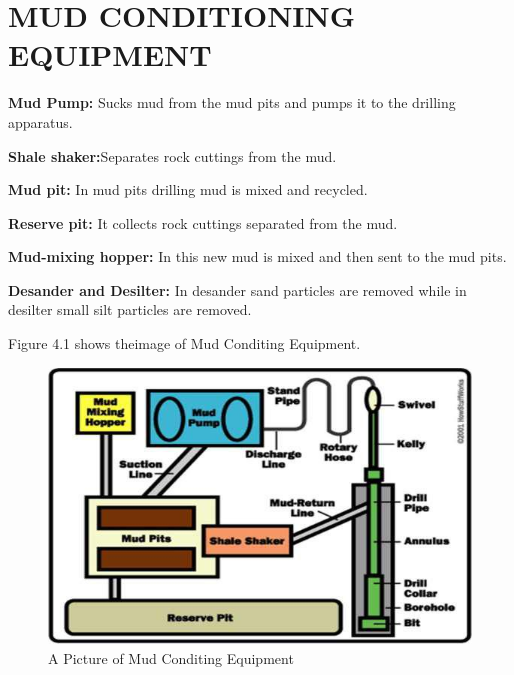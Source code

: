 \chapter{MUD CONDITIONING EQUIPMENT}

\textbf{Mud Pump:} Sucks mud from the mud pits and pumps it to the drilling apparatus.

\vspace{1em}

\noindent \textbf{Shale shaker:}Separates rock cuttings from the mud.

\vspace{1em}

\noindent \textbf{Mud pit:} In mud pits drilling mud is mixed and recycled. 

\vspace{1em}

\noindent \textbf{Reserve pit:} It collects rock cuttings separated from the mud.

\vspace{1em}

\noindent \textbf{Mud-mixing hopper:} In this new mud is mixed and then sent to the mud pits.

\vspace{1em}

\noindent \textbf{Desander and Desilter:} In desander sand particles are removed while in desilter small silt particles are removed.

\vspace{1em}

\noindent Figure 4.1 shows theimage of Mud Conditing Equipment.

\vspace{1em}

\begin{figure}[h]
\includegraphics[scale=0.6]{images/Mudconditingequipment}
\centering 
\caption{A Picture of Mud Conditing Equipment}
\end{figure}



